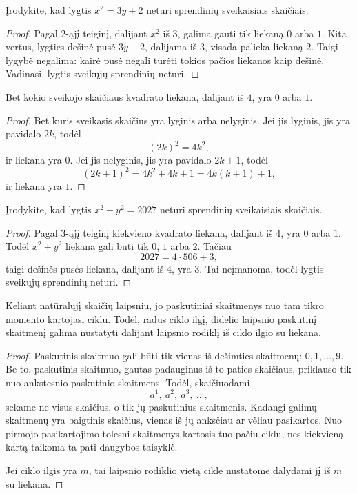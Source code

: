 \documentclass[11pt,a4paper]{scrartcl}
\begin{document}
\begin{example}
Įrodykite, kad lygtis $x^2=3y+2$ neturi sprendinių sveikaisiais skaičiais.
\end{example}

\begin{proof}
Pagal 2-ąjį teiginį, dalijant $x^2$ iš $3$, galima gauti tik liekaną $0$ arba $1$.
Kita vertus, lygties dešinė pusė $3y+2$, dalijama iš $3$, visada palieka liekaną $2$.
Taigi lygybė negalima: kairė pusė negali turėti tokios pačios liekanos kaip dešinė.
Vadinasi, lygtis sveikųjų sprendinių neturi.
\end{proof}

\begin{proposition}
Bet kokio sveikojo skaičiaus kvadrato liekana, dalijant iš $4$, yra $0$ arba $1$.
\end{proposition}

\begin{proof}
Bet kuris sveikasis skaičius yra lyginis arba nelyginis. Jei jis lyginis, jis yra pavidalo $2k$, todėl
\[
(2k)^2=4k^2,
\]
ir liekana yra $0$. Jei jis nelyginis, jis yra pavidalo $2k+1$, todėl
\[
(2k+1)^2=4k^2+4k+1=4k(k+1)+1,
\]
ir liekana yra $1$.
\end{proof}

\begin{example}
Įrodykite, kad lygtis $x^2+y^2=2027$ neturi sprendinių sveikaisiais skaičiais.
\end{example}

\begin{proof}
Pagal 3-ąjį teiginį kiekvieno kvadrato liekana, dalijant iš $4$, yra $0$ arba $1$. Todėl $x^2+y^2$ liekana gali būti tik $0$, $1$ arba $2$.
Tačiau
\[
2027=4\cdot 506+3,
\]
taigi dešinės pusės liekana, dalijant iš $4$, yra $3$. Tai neįmanoma, todėl lygtis sveikųjų sprendinių neturi.
\end{proof}

\begin{proposition}
Keliant natūralųjį skaičių laipsniu, jo paskutiniai skaitmenys nuo tam tikro momento kartojasi ciklu. Todėl, radus ciklo ilgį, didelio laipsnio paskutinį skaitmenį galima nustatyti dalijant laipsnio rodiklį iš ciklo ilgio su liekana.
\end{proposition}

\begin{proof}
Paskutinis skaitmuo gali būti tik vienas iš dešimties skaitmenų: $0,1,\ldots,9$. Be to, paskutinis skaitmuo, gautas padauginus iš to paties skaičiaus, priklauso tik nuo ankstesnio paskutinio skaitmens. Todėl, skaičiuodami
\[
a^1,\ a^2,\ a^3,\ \ldots,
\]
sekame ne visus skaičius, o tik jų paskutinius skaitmenis. Kadangi galimų skaitmenų yra baigtinis skaičius, vienas iš jų anksčiau ar vėliau pasikartos. Nuo pirmojo pasikartojimo tolesni skaitmenys kartosis tuo pačiu ciklu, nes kiekvieną kartą taikoma ta pati daugybos taisyklė.

Jei ciklo ilgis yra $m$, tai laipsnio rodiklio vietą cikle nustatome dalydami jį iš $m$ su liekana.
\end{proof}
\end{document}

